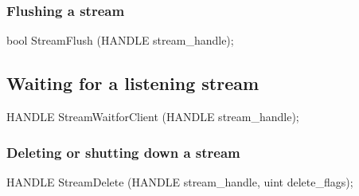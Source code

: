 \subsubsection*{Flushing a stream}


\begin{paldef}
bool StreamFlush (HANDLE stream_handle);
\end{paldef}


\subsection*{Waiting for a listening stream}


\begin{paldef}
HANDLE StreamWaitforClient (HANDLE stream_handle);
\end{paldef} 


\subsubsection*{Deleting or shutting down a stream}


\begin{paldef}
HANDLE StreamDelete (HANDLE stream_handle,
                     uint delete_flags);
\end{paldef}